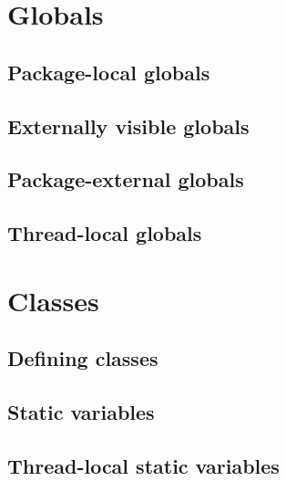 \documentclass{article}
\begin{document}
\section{Globals}
\label{sec:globals}

\subsection{Package-local globals}
\label{sub:globals:local}

\subsection{Externally visible globals}
\label{sub:globals:visible}

\subsection{Package-external globals}
\label{sub:globals:extern}

\subsection{Thread-local globals}
\label{sub:globals:threadlocal}

\section{Classes}
\label{sec:classes}

\subsection{Defining classes}
\label{sub:classes:definition}

\subsection{Static variables}
\label{sub:classes:static}

\subsection{Thread-local static variables}
\label{sub:classes:threadlocal}
\end{document}
